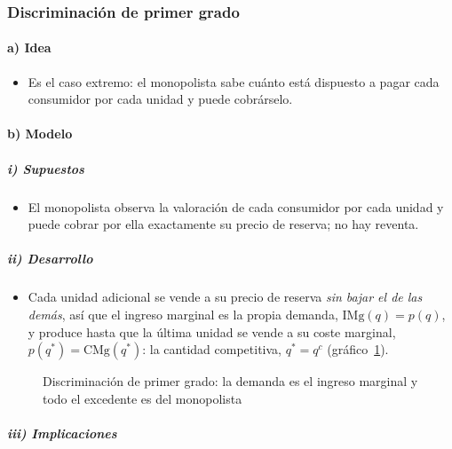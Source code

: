 \documentclass[11pt]{article}
\begin{document}
\subsubsection{Discriminación de primer grado}\label{sec:discriminacion-primer-grado}

\paragraph{a) Idea}

\begin{itemize}
\item Es el caso extremo: el monopolista sabe cuánto está dispuesto a pagar cada consumidor por cada unidad y puede cobrárselo.
\end{itemize}

\paragraph{b) Modelo}

\subparagraph{i) Supuestos}

\begin{itemize}
\item El monopolista observa la valoración de cada consumidor por cada unidad y puede cobrar por ella exactamente su precio de reserva; no hay reventa.
\end{itemize}

\subparagraph{ii) Desarrollo}

\begin{itemize}
\item Cada unidad adicional se vende a su precio de reserva \emph{sin bajar el de las demás}, así que el ingreso marginal es la propia demanda, $\mathrm{IMg}(q)=p(q)$, y produce hasta que la última unidad se vende a su coste marginal, $p(q^{*})=\mathrm{CMg}(q^{*})$: la cantidad competitiva, $q^{*}=q^c$ (gráfico~\ref{fig:primer-grado}).
\end{itemize}

\begin{figure}[H]
\centering
\caption{Discriminación de primer grado: la demanda es el ingreso marginal y todo el excedente es del monopolista}\label{fig:primer-grado}
\end{figure}

\subparagraph{iii) Implicaciones}
\end{document}
